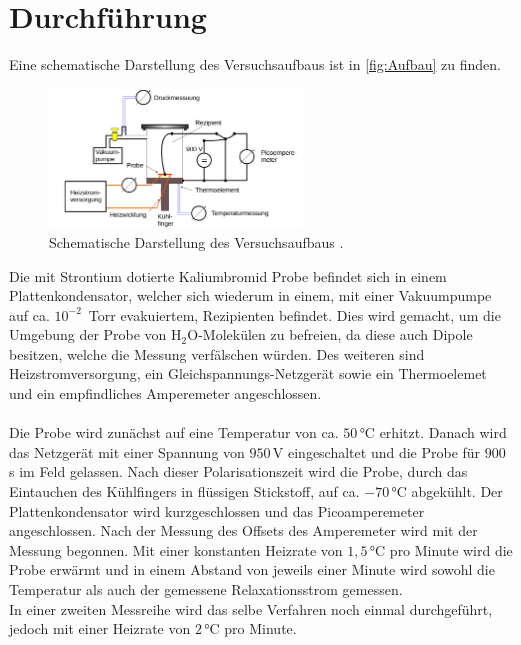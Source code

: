 \section{Durchführung}
\label{sec:Durchführung}
Eine schematische Darstellung des Versuchsaufbaus ist in \autoref{fig:Aufbau} zu finden.
\begin{figure}[H]
  \centering
  \includegraphics[width=0.6\textwidth]{pics/Aufbau.png}
  \caption{Schematische Darstellung des Versuchsaufbaus \cite{Anleitung}.}
  \label{fig:Aufbau}
\end{figure}
Die mit Strontium dotierte Kaliumbromid Probe befindet sich in einem Plattenkondensator,
welcher sich wiederum in einem, mit einer Vakuumpumpe auf ca. $10^{-2}\,$ Torr evakuiertem, Rezipienten befindet.
Dies wird gemacht, um die Umgebung der Probe von $\text{H}_2\text{O}$-Molekülen zu befreien, da
diese auch Dipole besitzen, welche die Messung verfälschen würden.
Des weiteren sind Heizstromversorgung, ein Gleichspannungs-Netzgerät sowie ein Thermoelemet und
ein empfindliches Amperemeter angeschlossen.\\
\\Die Probe wird zunächst auf eine Temperatur von ca. $50\,$°C erhitzt. Danach wird
das Netzgerät mit einer Spannung von $950\,$V eingeschaltet und die Probe für $900\,$s
im Feld gelassen. Nach dieser Polarisationszeit wird die Probe, durch das Eintauchen des Kühlfingers
in flüssigen Stickstoff, auf ca. $-70\,$°C abgekühlt. Der Plattenkondensator wird
kurzgeschlossen und das Picoamperemeter angeschlossen.
Nach der Messung des Offsets des Amperemeter wird mit der Messung begonnen.
Mit einer konstanten Heizrate von $1,5\,$°C pro Minute wird die Probe erwärmt und
in einem Abstand von jeweils einer Minute wird sowohl die Temperatur als auch der
gemessene Relaxationsstrom gemessen.\\
In einer zweiten Messreihe wird das selbe Verfahren noch einmal durchgeführt, jedoch mit
einer Heizrate von $2\,$°C pro Minute.
